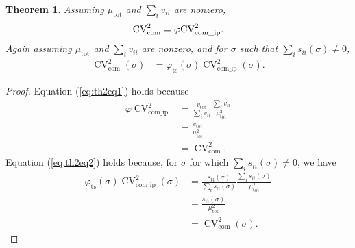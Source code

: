 \documentclass[letterpaper,11pt]{article}
\newcommand{\CV}{{\operatorname{CV}}}
\newcommand{\com}{{\operatorname{com}}}
\newcommand{\comip}{{\operatorname{com\_ip}}}
\newcommand{\ts}{{\operatorname{ts}}}
\newtheorem{theorem}{Theorem}[]
\begin{document}
\begin{theorem}\label{thm:relate}
Assuming $\mu_{\text{tot}}$ and $\sum_i v_{ii}$ are nonzero,
\begin{equation}
\CV_{\com}^2 = \varphi \CV_{\comip}^2. \label{eq:th2eq1}\\
\end{equation}
Again assuming $\mu_{\text{tot}}$ and $\sum_i v_{ii}$ are nonzero, and for $\sigma$ such
that $\sum_i s_{ii}(\sigma) \neq 0$,
\begin{align}
\CV_{\com}^2(\sigma) &= \varphi_{\ts}(\sigma) \CV_{\comip}^2(\sigma). \label{eq:th2eq2}
\end{align}
\end{theorem}
\begin{proof}
Equation (\ref{eq:th2eq1}) holds because 
\begin{align}
\varphi \CV_{\comip}^2 &= \frac{v_{\text{tot}}}{\sum_i v_{ii}}
\frac{\sum_i v_{ii}}{\mu_{\text{tot}}^2} \\
&= \frac{v_{\text{tot}}}{\mu_{\text{tot}}^2} \\
&= \CV_{\com}^2. 
\end{align}
Equation (\ref{eq:th2eq2}) holds because, for $\sigma$ for which 
$\sum_i s_{ii}(\sigma) \neq 0$, we have
\begin{align}
\varphi_{\ts}(\sigma) \CV_{\comip}^2(\sigma) &= 
\frac{s_{\text{tt}}(\sigma)}{\sum_i s_{ii}(\sigma)}
\frac{\sum_i s_{ii}(\sigma)}{\mu_{\text{tot}}^2} \\
&= \frac{s_{\text{tt}}(\sigma)}{\mu_{\text{tot}}^2} \\
&= \CV_{\com}^2(\sigma).
\end{align}
\end{proof}
\end{document}

